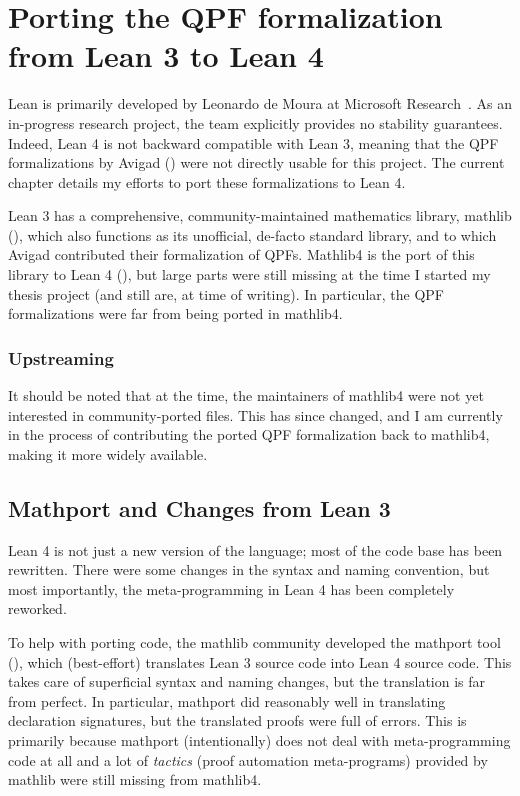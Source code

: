 
\chapter{Porting the QPF formalization from Lean 3 to Lean 4}%
\label{ch:porting}

Lean is primarily developed by Leonardo de Moura \etal{} at Microsoft Research~\cite{demouraLeanTheoremProver2015, avigadTheoremProvingLean}. As an in-progress research project, the team explicitly provides no stability guarantees. Indeed, Lean 4 is not backward compatible with Lean 3, meaning that the QPF formalizations by Avigad \etal{}
(\cite{avigadDataTypesQuotients2019a}) were not directly usable for this project. The current chapter details my efforts to port these formalizations to Lean 4.



Lean 3 has a comprehensive, community-maintained mathematics library, mathlib (\cite{themathlibcommunityLeanMathematicalLibrary2020}), 
which also functions as its unofficial, de-facto standard library, and to which Avigad \etal{} contributed
their formalization of QPFs.
Mathlib4 is the port of this library to Lean 4 (\cite{mathlib4}),
but large parts were still missing at the time I started my thesis project (and still are, at time of writing).
In particular, the QPF formalizations were far from being ported in mathlib4.



\subsection*{Upstreaming}
It should be noted that at the time, the maintainers of mathlib4 were not yet interested in 
community-ported files. This has since changed, and I am currently in the process of contributing
the ported QPF formalization back to mathlib4, making it more widely available.




\section{Mathport and Changes from Lean 3}
Lean 4 is not just a new version of the language; most of the code base has been rewritten.
There were some changes in the syntax and naming convention, but most importantly, 
the meta-programming in Lean 4 has been completely reworked.

To help with porting code, the mathlib community developed the mathport tool (\cite{mathport}), which 
(best-effort) translates Lean 3 source code into Lean 4 source code. This takes care of superficial 
syntax and naming changes, but the translation is far from perfect.
In particular, mathport did reasonably well in translating declaration signatures, 
but the translated proofs were full of errors.
This is primarily because mathport (intentionally) does not deal with meta-programming code at all and a lot
of \emph{tactics} (proof automation meta-programs) provided by mathlib were still missing from mathlib4.


